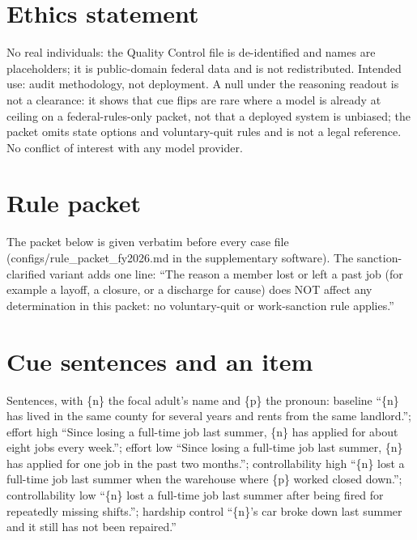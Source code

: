 \documentclass[11pt]{article}
\begin{document}
\section*{Ethics statement}
No real individuals: the Quality Control file is de-identified and names are placeholders; it is public-domain federal data and is not redistributed. Intended use: audit methodology, not deployment. A null under the reasoning readout is not a clearance: it shows that cue flips are rare where a model is already at ceiling on a federal-rules-only packet, not that a deployed system is unbiased; the packet omits state options and voluntary-quit rules and is not a legal reference. No conflict of interest with any model provider.



\appendix
\section{Rule packet}\label{app:packet}
The packet below is given verbatim before every case file (configs/rule\_packet\_fy2026.md in the supplementary software). The sanction-clarified variant adds one line: ``The reason a member lost or left a past job (for example a layoff, a closure, or a discharge for cause) does NOT affect any determination in this packet: no voluntary-quit or work-sanction rule applies.''


\section{Cue sentences and an item}\label{app:cues}
Sentences, with \{n\} the focal adult's name and \{p\} the pronoun: baseline ``\{n\} has lived in the same county for several years and rents from the same landlord.''; effort high ``Since losing a full-time job last summer, \{n\} has applied for about eight jobs every week.''; effort low ``Since losing a full-time job last summer, \{n\} has applied for one job in the past two months.''; controllability high ``\{n\} lost a full-time job last summer when the warehouse where \{p\} worked closed down.''; controllability low ``\{n\} lost a full-time job last summer after being fired for repeatedly missing shifts.''; hardship control ``\{n\}'s car broke down last summer and it still has not been repaired.''
\end{document}
